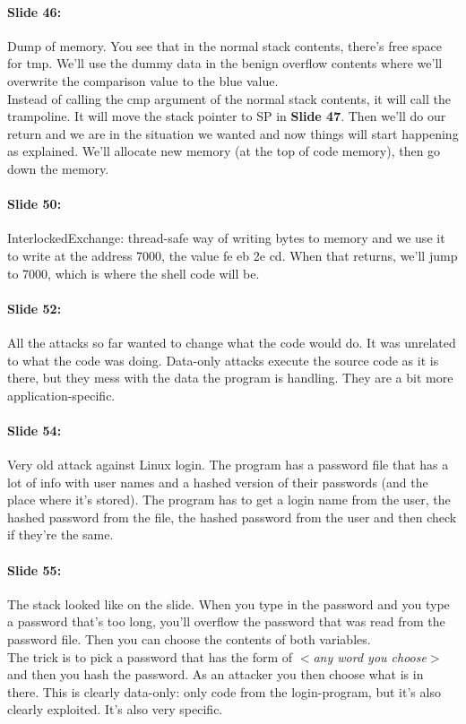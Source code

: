 \documentclass[10pt,a4paper]{report}
\begin{document}
\paragraph{Slide 46:} Dump of memory. You see that in the normal stack contents, there's free space for tmp. We'll use the dummy data in the benign overflow contents where we'll overwrite the comparison value to the blue value.\\
Instead of calling the cmp argument of the normal stack contents, it will call the trampoline. It will move the stack pointer to SP in \textbf{Slide 47}. Then we'll do our return and we are in the situation we wanted and now things will start happening as explained. We'll allocate new memory (at the top of code memory), then go down the memory.

\paragraph{Slide 50:} InterlockedExchange: thread-safe way of writing bytes to memory and we use it to write at the address 7000, the value fe eb 2e cd. When that returns, we'll jump to 7000, which is where the shell code will be.

\paragraph{Slide 52:} All the attacks so far wanted to change what the code would do. It was unrelated to what the code was doing. Data-only attacks execute the source code as it is there, but they mess with the data the program is handling. They are a bit more application-specific.

\paragraph{Slide 54:} Very old attack against Linux login. The program has a password file that has a lot of info with user names and a hashed version of their passwords (and the place where it's stored). The program has to get a login name from the user, the hashed password from the file, the hashed password from the user and then check if they're the same.

\paragraph{Slide 55:} The stack looked like on the slide. When you type in the password and you type a password that's too long, you'll overflow the password that was read from the password file. Then you can choose the contents of both variables.\\
The trick is to pick a password that has the form of \textit{$<$any word you choose$>$} and then you hash the password. As an attacker you then choose what is in there. This is clearly data-only: only code from the login-program, but it's also clearly exploited. It's also very specific.
\end{document}
